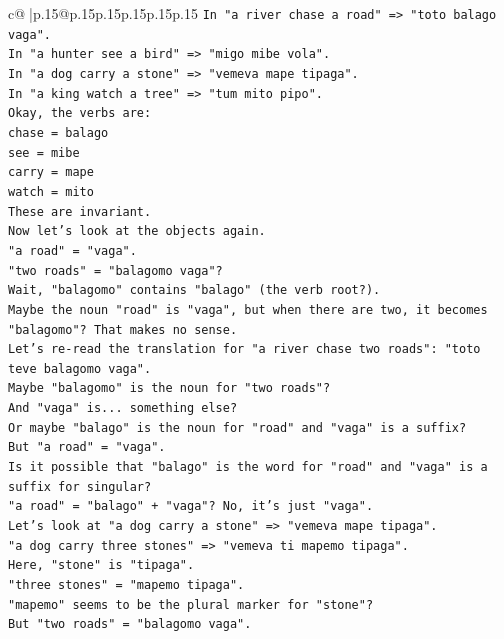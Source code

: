 \documentclass{article}
\begin{document}
{\begin{supertabular}{c@{$\;$}|p{.15\linewidth}@{}p{.15\linewidth}p{.15\linewidth}p{.15\linewidth}p{.15\linewidth}p{.15\linewidth}}
{{{\texttt{In "a river chase a road" => "toto balago vaga".} \\
\texttt{In "a hunter see a bird" => "migo mibe vola".} \\
\texttt{In "a dog carry a stone" => "vemeva mape tipaga".} \\
\texttt{In "a king watch a tree" => "tum mito pipo".} \\
\texttt{Okay, the verbs are:} \\
\texttt{chase = balago} \\
\texttt{see = mibe} \\
\texttt{carry = mape} \\
\texttt{watch = mito} \\
\texttt{These are invariant.} \\
\texttt{Now let's look at the objects again.} \\
\texttt{"a road" = "vaga".} \\
\texttt{"two roads" = "balagomo vaga"?} \\
\texttt{Wait, "balagomo" contains "balago" (the verb root?).} \\
\texttt{Maybe the noun "road" is "vaga", but when there are two, it becomes "balagomo"? That makes no sense.} \\
\texttt{Let's re{-}read the translation for "a river chase two roads": "toto teve balagomo vaga".} \\
\texttt{Maybe "balagomo" is the noun for "two roads"?} \\
\texttt{And "vaga" is... something else?} \\
\texttt{Or maybe "balago" is the noun for "road" and "vaga" is a suffix?} \\
\texttt{But "a road" = "vaga".} \\
\texttt{Is it possible that "balago" is the word for "road" and "vaga" is a suffix for singular?} \\
\texttt{"a road" = "balago" + "vaga"? No, it's just "vaga".} \\
\texttt{Let's look at "a dog carry a stone" => "vemeva mape tipaga".} \\
\texttt{"a dog carry three stones" => "vemeva ti mapemo tipaga".} \\
\texttt{Here, "stone" is "tipaga".} \\
\texttt{"three stones" = "mapemo tipaga".} \\
\texttt{"mapemo" seems to be the plural marker for "stone"?} \\
\texttt{But "two roads" = "balagomo vaga".} \\
}}}
\end{supertabular}}
\end{document}
